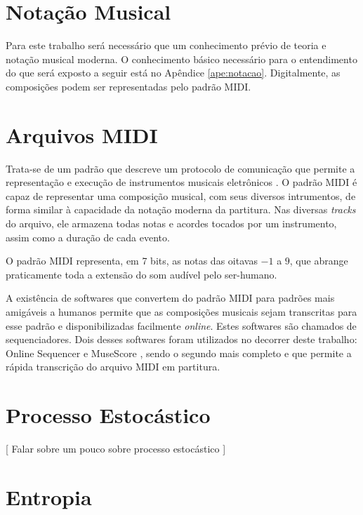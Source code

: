 \label{cap:metodo}
\section{Notação Musical}

Para este trabalho será necessário que um conhecimento prévio de teoria e notação musical moderna. O conhecimento básico necessário para o entendimento do que será exposto a seguir está no Apêndice \ref{ape:notacao}.
Digitalmente, as composições podem ser representadas pelo padrão MIDI.

\section{Arquivos MIDI}

Trata-se de um padrão que descreve um protocolo de comunicação que permite a representação e execução de instrumentos musicais eletrônicos \cite{midi}. O padrão MIDI é capaz de representar uma composição musical, com seus diversos intrumentos, de forma similar à capacidade da notação moderna da partitura. Nas diversas \textit{tracks} do arquivo, ele armazena todas notas e acordes tocados por um instrumento, assim como a duração de cada evento.

O padrão MIDI representa, em 7 bits, as notas das oitavas $-1$ a $9$, que abrange praticamente toda a extensão do som audível pelo ser-humano.

A existência de softwares que convertem do padrão MIDI para padrões mais amigáveis a humanos permite que as composições musicais sejam transcritas para esse padrão e disponibilizadas facilmente \textit{online}. Estes softwares são chamados de sequenciadores. Dois desses softwares foram utilizados no decorrer deste trabalho: Online Sequencer \cite{sequencer} e MuseScore \cite{musescore}, sendo o segundo mais completo e que permite a rápida transcrição do arquivo MIDI em partitura.


\section{Processo Estocástico}
[ Falar sobre um pouco sobre processo estocástico ]


\section{Entropia}


